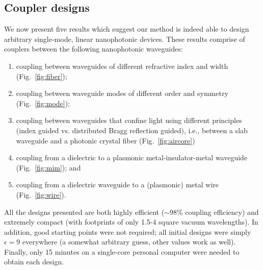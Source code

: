 \documentclass[letterpaper,10pt]{article}
\begin{document}
\subsection{Coupler designs}
We now present five results which suggest our method
    is indeed able to design arbitrary single-mode, linear nanophotonic devices.
These results comprise of couplers between 
    the following nanophotonic waveguides:
    \begin{enumerate}
    \item coupling between waveguides of different refractive index and width
        (Fig.~\ref{fig:fiber});
    \item coupling between waveguide modes of different order and symmetry
        (Fig.~\ref{fig:mode});
    \item coupling between waveguides that confine light 
        using different principles 
        (index guided vs. distributed Bragg reflection guided), 
        i.e., between a slab waveguide and a photonic crystal fiber
        (Fig.~\ref{fig:aircore})
    \item coupling from a dielectric to a plasmonic metal-insulator-metal 
        waveguide (Fig.~\ref{fig:mim}); and
    \item coupling from a dielectric waveguide to a (plasmonic) metal wire
        (Fig.~\ref{fig:wire}).
    \end{enumerate}
All the designs presented are both highly efficient 
    ($\sim 98\%$ coupling efficiency)
    and extremely compact 
    (with footprints of only 1.5-4 square vacuum wavelengths).
In addition, good starting points were not required; 
    all initial designs were simply $\epsilon = 9$ everywhere
    (a somewhat arbitrary guess, other values work as well).
Finally, only 15 minutes on a single-core personal computer
    were needed to obtain each design.
\end{document}
